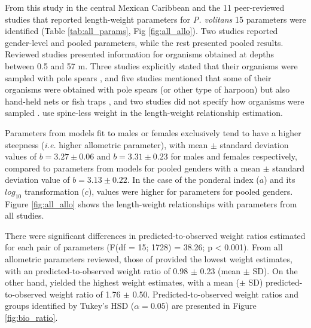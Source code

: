 \documentclass[fleqn,10pt,lineno]{wlpeerj} %
\begin{document}
From this study in the central Mexican Caribbean and the 11
peer-reviewed studies that reported length-weight parameters for
\emph{P. volitans} 15 parameters were identified (Table
\ref{tab:all_params}, Fig \ref{fig:all_allo}). Two studies
\citep{aguilarperera_2016,fogg_2013} reported gender-level and pooled
parameters, while the rest presented pooled results. Reviewed studies
presented information for organisms obtained at depths between 0.5 and
57 m. Three studies explicitly stated that their organisms were sampled
with pole spears \citep{aguilarperera_2016,chin_2016,dahl_2014}, and
five studies mentioned that some of their organisms were obtained with
pole spears (or other type of harpoon) but also hand-held nets or fish
traps
\citep{sandel_2015,barbour_2011,fogg_2013,edwards_2014,sabidoitza_2016,toledohernndez_2014},
and two studies did not specify how organisms were sampled
\citep{deleon_2013,darling_2011}. \citet{fogg_2013} use spine-less
weight in the length-weight relationship estimation.

Parameters from models fit to males or females exclusively tend to have
a higher steepness (\emph{i.e.} higher allometric parameter), with mean
\(\pm\) standard deviation values of \(b = 3.27 \pm 0.06\) and
\(b = 3.31 \pm 0.23\) for males and females respectively, compared to
parameters from models for pooled genders with a mean \(\pm\) standard
deviation value of \(b = 3.13 \pm 0.22\). In the case of the ponderal
index (\(a\)) and its \(log_{10}\) transformation (\(c\)), values were
higher for parameters for pooled genders. Figure \ref{fig:all_allo}
shows the length-weight relationships with parameters from all studies.

There were significant differences in predicted-to-observed weight
ratios estimated for each pair of parameters (F(df = 15; 1728) = 38.26;
p \textless{} 0.001). From all allometric parameters reviewed, those of
\citet{edwards_2014} provided the lowest weight estimates, with an
predicted-to-observed weight ratio of 0.98 \(\pm\) 0.23 (mean \(\pm\)
SD). On the other hand,\citet{barbour_2011} yielded the highest weight
estimates, with a mean (\(\pm\) SD) predicted-to-observed weight ratio
of 1.76 \(\pm\) 0.50. Predicted-to-observed weight ratios and groups
identified by Tukey's HSD (\(\alpha = 0.05\)) are presented in Figure
\ref{fig:bio_ratio}.
\end{document}

